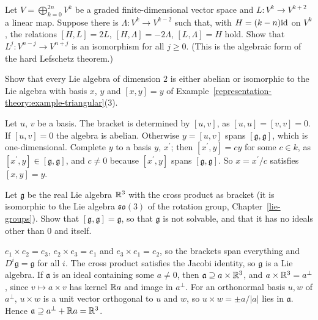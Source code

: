 \begin{exercise}\label{representation-theory:exercise-sl2-lefschetz}
Let $V = \bigoplus_{k=0}^{2n} V^k$ be a graded finite-dimensional vector space and $L \colon V^k \to V^{k+2}$ a linear map. Suppose there is
$\Lambda \colon V^k \to V^{k-2}$ such that, with $H = (k - n)\mathrm{id}$ on $V^k$, the relations $[H, L] = 2L$, $[H, \Lambda] = -2\Lambda$,
$[L, \Lambda] = H$ hold. Show that $L^j \colon V^{n-j} \to V^{n+j}$ is an isomorphism for all $j \geq 0$. (This is the algebraic form
of the hard Lefschetz theorem.)
\end{exercise}

\begin{exercise}\label{representation-theory:exercise-two-dimensional}
Show that every Lie algebra of dimension $2$ is either abelian or isomorphic to the Lie algebra with basis $x$, $y$ and $[x, y] = y$ of
Example~\ref{representation-theory:example-triangular}(3).
\end{exercise}

\begin{solution}
Let $u$, $v$ be a basis. The bracket is determined by $[u, v]$, as $[u, u] = [v, v] = 0$. If $[u, v] = 0$ the algebra is abelian. Otherwise $y = [u, v]$ spans
$[\mathfrak{g}, \mathfrak{g}]$, which is one-dimensional. Complete $y$ to a basis $y$, $x^{\prime}$; then $[x^{\prime}, y] = cy$ for some $c \in k$, as $[x^{\prime}, y] \in [\mathfrak{g}, \mathfrak{g}]$,
and $c \neq 0$ because $[x^{\prime}, y]$ spans $[\mathfrak{g}, \mathfrak{g}]$. So $x = x^{\prime}/c$ satisfies $[x, y] = y$.
\end{solution}

\begin{exercise}\label{representation-theory:exercise-so3-not-solvable}
Let $\mathfrak{g}$ be the real Lie algebra $\mathbb{R}^3$ with the cross product as bracket (it is isomorphic to the Lie algebra $\mathfrak{so}(3)$ of the rotation group,
Chapter~\ref{lie-groups}). Show that $[\mathfrak{g}, \mathfrak{g}] = \mathfrak{g}$, so that $\mathfrak{g}$ is not solvable, and that it has no ideals other than $0$ and itself.
\end{exercise}

\begin{solution}
$e_1 \times e_2 = e_3$, $e_2 \times e_3 = e_1$ and $e_3 \times e_1 = e_2$, so the brackets span everything and $D^i\mathfrak{g} = \mathfrak{g}$ for all $i$. The cross product satisfies the Jacobi identity, so $\mathfrak{g}$ is a Lie algebra. If $\mathfrak{a}$ is an
ideal containing some $a \neq 0$, then $\mathfrak{a} \supseteq a \times \mathbb{R}^3$, and $a \times \mathbb{R}^3 = a^\perp$, since $v \mapsto a \times v$ has kernel $\mathbb{R} a$ and image in
$a^\perp$. For an orthonormal basis $u, w$ of $a^\perp$, $u \times w$ is a unit vector orthogonal to $u$ and $w$, so $u \times w = \pm a/|a|$ lies in $\mathfrak{a}$. Hence
$\mathfrak{a} \supseteq a^\perp + \mathbb{R} a = \mathbb{R}^3$.
\end{solution}

